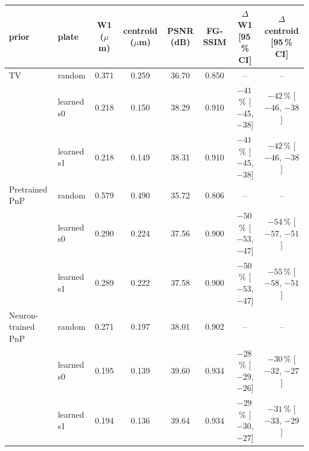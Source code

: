 \begin{tabular}{@{}ll cccc cc@{}}\toprule
prior & plate & W1 ($\mu$m) & centroid ($\mu$m) & PSNR (dB) & FG-SSIM & $\Delta$W1 [95\,\% CI] & $\Delta$centroid [95\,\% CI]\\\midrule
TV & random & 0.371 & 0.259 & 36.70 & 0.850 & -- & --\\
 & learned s0 & 0.218 & 0.150 & 38.29 & 0.910 & $-41$\,\% [$-45$, $-38$] & $-42$\,\% [$-46$, $-38$]\\
 & learned s1 & 0.218 & 0.149 & 38.31 & 0.910 & $-41$\,\% [$-45$, $-38$] & $-42$\,\% [$-46$, $-38$]\\
\midrule
Pretrained PnP & random & 0.579 & 0.490 & 35.72 & 0.806 & -- & --\\
 & learned s0 & 0.290 & 0.224 & 37.56 & 0.900 & $-50$\,\% [$-53$, $-47$] & $-54$\,\% [$-57$, $-51$]\\
 & learned s1 & 0.289 & 0.222 & 37.58 & 0.900 & $-50$\,\% [$-53$, $-47$] & $-55$\,\% [$-58$, $-51$]\\
\midrule
Neuron-trained PnP & random & 0.271 & 0.197 & 38.01 & 0.902 & -- & --\\
 & learned s0 & 0.195 & 0.139 & 39.60 & 0.934 & $-28$\,\% [$-29$, $-26$] & $-30$\,\% [$-32$, $-27$]\\
 & learned s1 & 0.194 & 0.136 & 39.64 & 0.934 & $-29$\,\% [$-30$, $-27$] & $-31$\,\% [$-33$, $-29$]\\
\bottomrule\end{tabular}
